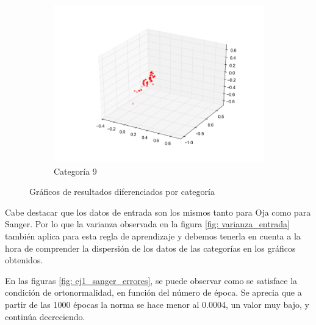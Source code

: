 \begin{figure}[H]
\begin{subfigure}[b]{0.33\textwidth}
                \includegraphics[width=\linewidth]{secciones/graficos/sanger/categoria_9.png}
                \caption{Categoría 9}
                \label{fig: ej1_sanger_categoria_9}
        \end{subfigure}
        \caption{Gráficos de resultados diferenciados por categoría}
        \label{fig: ej1_sanger_categorias}
\end{figure}


\par Cabe destacar que los datos de entrada son los mismos tanto para Oja como para Sanger. Por lo que la varianza observada en la figura \ref{fig: varianza_entrada} también aplica para esta regla de aprendizaje y debemos tenerla en cuenta a la hora de comprender la dispersión de los datos de las categorías en los gráficos obtenidos.


\par En las figuras \ref{fig: ej1_sanger_errores}, se puede observar como se satisface la condición de ortonormalidad, en función del número de época. Se aprecia que a partir de las 1000 épocas la norma se hace menor al 0.0004, un valor muy bajo, y continúa decreciendo.

